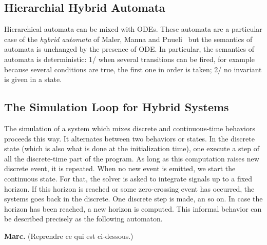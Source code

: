 \documentclass[11pt,titlepage,twoside]{report}
\newcommand{\Marc}[1]{{\bf Marc.} ({#1})}
\begin{document}


\subsection{Hierarchial Hybrid Automata}
Hierarchical automata can be mixed with ODEs. These automata are a
particular case of the \emph{hybrid automata} of Maler, Manna and
Pnueli~\cite{MalerMannaPnueli:hybrid92} but the semantics of automata is unchanged
by the presence of ODE. In particular, the semantics of automata
is deterministic: 1/ when several transitions can be fired, for example
because several conditions are true, the first one in order is taken; 2/ no invariant is given in a state.

\subsection{The Simulation Loop for Hybrid Systems}

\newcommand{\Solve}[2]{\mathit{solve}({#1})({#2})}
\newcommand{\Ifthenelse}[3]
   {\mathtt{if}\,{#1}\,\mathtt{then}\,{#2}\,\mathtt{else}\,{#3}}

The simulation of a system which mixes discrete and continuous-time
behaviors proceeds this way. It alternates
between two behaviors or states. In the discrete state (which is also what is done
at the initialization time), one execute a step of all the
discrete-time part of the program. As long as this computation raises
new discrete event, it is repeated. When no new event is emitted, we
start the continuous state. For that, the solver is asked to integrate
signals up to a fixed horizon. If this horizon is reached or some
zero-crossing event has occurred, the systems goes back in the
discrete. One discrete step is made, an so on. In case the horizon has
been reached, a new horizon is computed. This informal behavior can be
described precisely as the following automaton.

\Marc{Reprendre ce qui est ci-dessous.}
\end{document}
